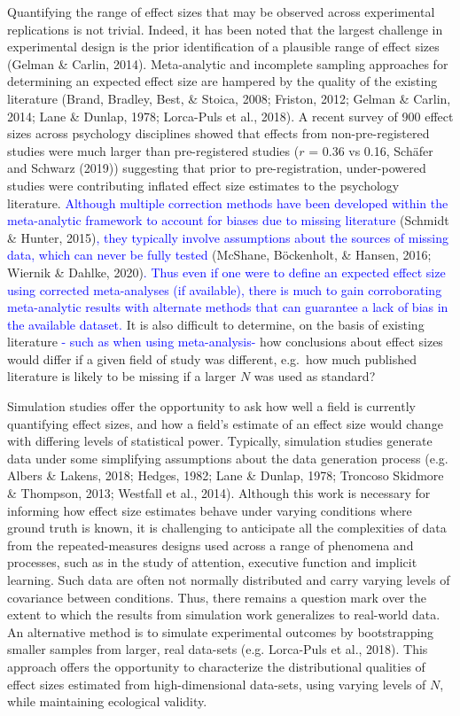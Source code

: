 \documentclass[
  man]{apa6}
\begin{document}
Quantifying the range of effect sizes that may be observed across experimental replications is not trivial. Indeed, it has been noted that the largest challenge in experimental design is the prior identification of a plausible range of effect sizes (Gelman \& Carlin, 2014). Meta-analytic and incomplete sampling approaches for determining an expected effect size are hampered by the quality of the existing literature (Brand, Bradley, Best, \& Stoica, 2008; Friston, 2012; Gelman \& Carlin, 2014; Lane \& Dunlap, 1978; Lorca-Puls et al., 2018). A recent survey of 900 effect sizes across psychology disciplines showed that effects from non-pre-registered studies were much larger than pre-registered studies (\(r\) = 0.36 vs 0.16, Schäfer and Schwarz (2019)) suggesting that prior to pre-registration, under-powered studies were contributing inflated effect size estimates to the psychology literature. \textcolor{blue}{Although multiple correction methods have been developed within the meta-analytic framework to account for biases due to missing literature} (Schmidt \& Hunter, 2015)\textcolor{blue}{, they typically involve assumptions about the sources of missing data, which can never be fully tested} (McShane, Böckenholt, \& Hansen, 2016; Wiernik \& Dahlke, 2020)\textcolor{blue}{. Thus even if one were to define an expected effect size using corrected meta-analyses (if available), there is much to gain corroborating meta-analytic results with alternate methods that can guarantee a lack of bias in the available dataset.} It is also difficult to determine, on the basis of existing literature \textcolor{blue}{- such as when using meta-analysis-} how conclusions about effect sizes would differ if a given field of study was different, e.g.~how much published literature is likely to be missing if a larger \(N\) was used as standard?

Simulation studies offer the opportunity to ask how well a field is currently quantifying effect sizes, and how a field's estimate of an effect size would change with differing levels of statistical power. Typically, simulation studies generate data under some simplifying assumptions about the data generation process (e.g. Albers \& Lakens, 2018; Hedges, 1982; Lane \& Dunlap, 1978; Troncoso Skidmore \& Thompson, 2013; Westfall et al., 2014). Although this work is necessary for informing how effect size estimates behave under varying conditions where ground truth is known, it is challenging to anticipate all the complexities of data from the repeated-measures designs used across a range of phenomena and processes, such as in the study of attention, executive function and implicit learning. Such data are often not normally distributed and carry varying levels of covariance between conditions. Thus, there remains a question mark over the extent to which the results from simulation work generalizes to real-world data. An alternative method is to simulate experimental outcomes by bootstrapping smaller samples from larger, real data-sets (e.g. Lorca-Puls et al., 2018). This approach offers the opportunity to characterize the distributional qualities of effect sizes estimated from high-dimensional data-sets, using varying levels of \(N\), while maintaining ecological validity.
\end{document}
